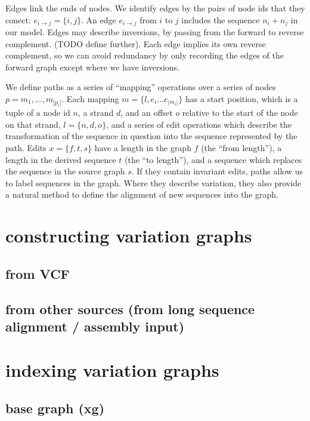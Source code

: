 \documentclass{article}
\begin{document}
Edges link the ends of nodes. 
We identify edges by the pairs of node ids that they conect: $e_{i \rightarrow j} = \{ i, j \}$.
An edge $e_{i \rightarrow j}$ from $i$ to $j$ includes the sequence $n_i + n_j$ in our model.
Edges may describe inversions, by passing from the forward to reverse complement.
(TODO define further).
Each edge implies its own reverse complement, so we can avoid redundancy by only recording the edges of the forward graph except where we have inversions.

We define paths as a series of ``mapping'' operations over a series of nodes $p = m_1, \ldots, m_{|p_i|}$.
Each mapping $m = \{ l, e_i \ldots e_{|m_i|} \}$ has a start position, which is a tuple of a node id $n$, a strand $d$, and an offset $o$ relative to the start of the node on that strand, $l = \{ n, d, o \}$, and a series of edit operations which describe the transformation of the sequence in question into the sequence represented by the path.
Edits $x = \{ f, t, s \}$ have a length in the graph $f$ (the ``from length''), a length in the derived sequence $t$ (the ``to length''), and a sequence which replaces the sequence in the source graph $s$.
If they contain invariant edits, paths allow us to label sequences in the graph.
Where they describe variation, they also provide a natural method to define the alignment of new sequences into the graph.

\section{constructing variation graphs}

\subsection{from VCF}

\subsection{from other sources (from long sequence alignment / assembly input)}


\section{indexing variation graphs}

\subsection{base graph (xg)}
\end{document}
